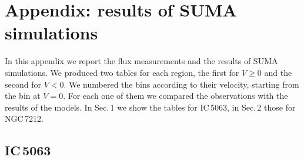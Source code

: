 \documentclass[../thesis.tex]{subfiles}
\begin{document}
\chapter{Appendix: results of SUMA simulations}

In this appendix we report the flux measurements and the results of SUMA simulations.
We produced two tables for each region, the first for $V\ge0$ and the second for $V<0$.
We numbered the bins according to their velocity, starting from the bin at $V=0$.
For each one of them we compared the observations with the results of the models.
In Sec.\,1 we show the tables for IC\,5063, in Sec.\,2 those for NGC\,7212. 

\section{IC\,5063}
\end{document}
